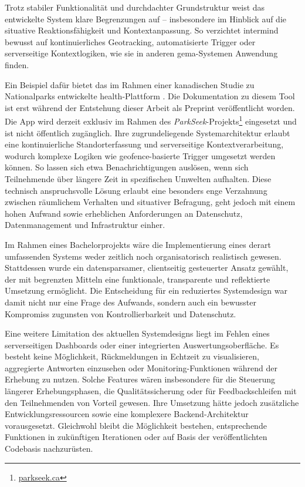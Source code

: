 \vspace{1em}

Trotz stabiler Funktionalität und durchdachter Grundstruktur weist das entwickelte System klare Begrenzungen auf -- insbesondere im Hinblick auf die situative Reaktionsfähigkeit und Kontextanpassung. So verzichtet \gls{intermind} bewusst auf kontinuierliches Geotracking, automatisierte Trigger oder serverseitige Kontextlogiken, wie sie in anderen \acrshort{gema}-Systemen Anwendung finden.

Ein Beispiel dafür bietet das im Rahmen einer kanadischen Studie zu Nationalparks entwickelte \acrshort{health}-Plattform \parencite{wrayHealthyEnvironmentsActive2025}. Die Dokumentation zu diesem Tool ist erst während der Entstehung dieser Arbeit als Preprint veröffentlicht worden. Die App wird derzeit exklusiv im Rahmen des \textit{ParkSeek}-Projekts\footnote{\href{https://parkseek.ca/}{parkseek.ca}} eingesetzt und ist nicht öffentlich zugänglich. Ihre zugrundeliegende Systemarchitektur erlaubt eine kontinuierliche Standorterfassung und serverseitige Kontextverarbeitung, wodurch komplexe Logiken wie geofence-basierte Trigger umgesetzt werden können. So lassen sich etwa Benachrichtigungen auslösen, wenn sich Teilnehmende über längere Zeit in spezifischen Umwelten aufhalten. Diese technisch anspruchsvolle Lösung erlaubt eine besonders enge Verzahnung zwischen räumlichem Verhalten und situativer Befragung, geht jedoch mit einem hohen Aufwand sowie erheblichen Anforderungen an Datenschutz, Datenmanagement und Infrastruktur einher.

Im Rahmen eines Bachelorprojekts wäre die Implementierung eines derart umfassenden Systems weder zeitlich noch organisatorisch realistisch gewesen. Stattdessen wurde ein datensparsamer, clientseitig gesteuerter Ansatz gewählt, der mit begrenzten Mitteln eine funktionale, transparente und reflektierte Umsetzung ermöglicht. Die Entscheidung für ein reduziertes Systemdesign war damit nicht nur eine Frage des Aufwands, sondern auch ein bewusster Kompromiss zugunsten von Kontrollierbarkeit und Datenschutz.

Eine weitere Limitation des aktuellen Systemdesigns liegt im Fehlen eines serverseitigen Dashboards oder einer integrierten Auswertungsoberfläche. Es besteht keine Möglichkeit, Rückmeldungen in Echtzeit zu visualisieren, aggregierte Antworten einzusehen oder Monitoring-Funktionen während der Erhebung zu nutzen. Solche Features wären insbesondere für die Steuerung längerer Erhebungsphasen, die Qualitätssicherung oder für Feedbackschleifen mit den Teilnehmenden von Vorteil gewesen. Ihre Umsetzung hätte jedoch zusätzliche Entwicklungsressourcen sowie eine komplexere Backend-Architektur vorausgesetzt. Gleichwohl bleibt die Möglichkeit bestehen, entsprechende Funktionen in zukünftigen Iterationen oder auf Basis der veröffentlichten Codebasis nachzurüsten.

